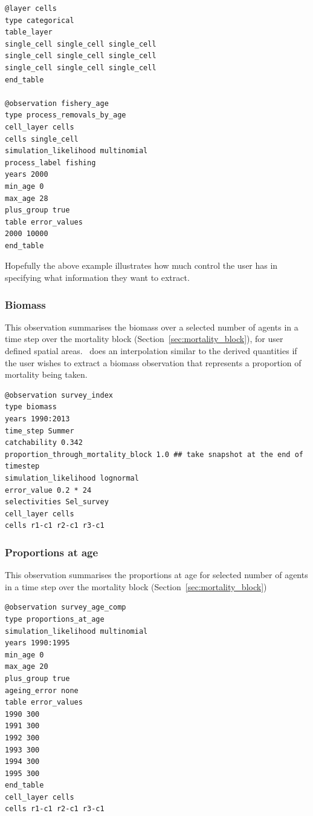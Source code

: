 {\small{\begin{verbatim}
@layer cells
type categorical
table_layer
single_cell single_cell single_cell
single_cell single_cell single_cell
single_cell single_cell single_cell
end_table

@observation fishery_age
type process_removals_by_age
cell_layer cells
cells single_cell
simulation_likelihood multinomial
process_label fishing
years 2000
min_age 0
max_age 28
plus_group true
table error_values
2000 10000
end_table
\end{verbatim}}}

Hopefully the above example illustrates how much control the user has in specifying what information they want to extract.

\subsubsection{Biomass}\label{subsubsec:biomass}
This observation summarises the biomass over a selected number of agents in a time step over the mortality block (Section~\ref{sec:mortality_block}), for user defined spatial areas. \IBM\ does an interpolation similar to the derived quantities if the user wishes to extract a biomass observation that represents a proportion of mortality being taken.

{\small{\begin{verbatim}
@observation survey_index
type biomass
years 1990:2013
time_step Summer
catchability 0.342
proportion_through_mortality_block 1.0 ## take snapshot at the end of timestep
simulation_likelihood lognormal
error_value 0.2 * 24
selectivities Sel_survey
cell_layer cells
cells r1-c1 r2-c1 r3-c1 
\end{verbatim}}}

\subsubsection{Proportions at age}\label{subsubsec:Proportions_at_age}
This observation summarises the proportions at age for selected number of agents in a time step over the mortality block (Section~\ref{sec:mortality_block})

{\small{\begin{verbatim}
@observation survey_age_comp
type proportions_at_age
simulation_likelihood multinomial
years 1990:1995
min_age 0
max_age 20
plus_group true
ageing_error none
table error_values
1990 300
1991 300
1992 300
1993 300
1994 300
1995 300
end_table
cell_layer cells
cells r1-c1 r2-c1 r3-c1
\end{verbatim}}}


